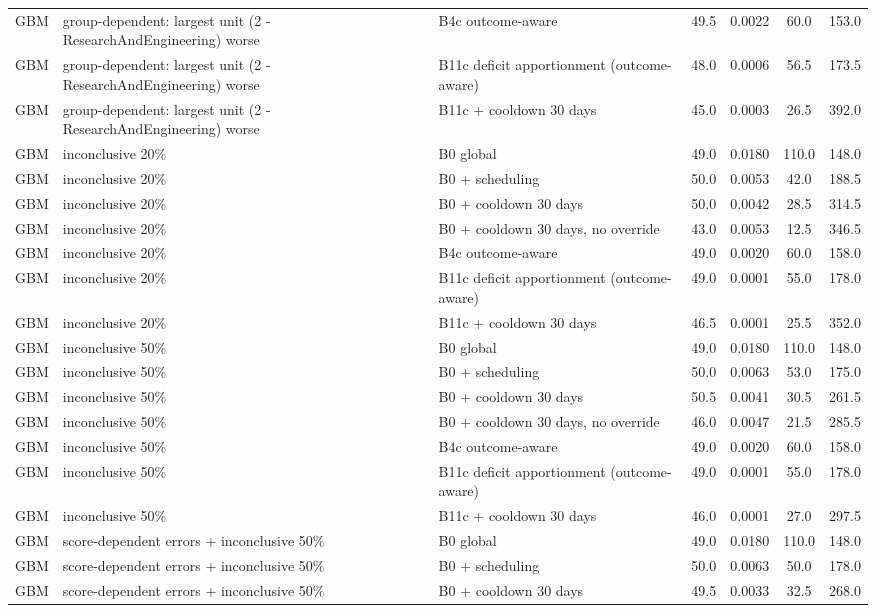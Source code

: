 \begin{longtable}{lp{5.2cm}p{4.4cm}cccc}
GBM & group-dependent: largest unit (2 - ResearchAndEngineering) worse & B4c outcome-aware & 49.5 & 0.0022 & 60.0 & 153.0 \\
GBM & group-dependent: largest unit (2 - ResearchAndEngineering) worse & B11c deficit apportionment (outcome-aware) & 48.0 & 0.0006 & 56.5 & 173.5 \\
GBM & group-dependent: largest unit (2 - ResearchAndEngineering) worse & B11c + cooldown 30 days & 45.0 & 0.0003 & 26.5 & 392.0 \\
GBM & inconclusive 20\% & B0 global & 49.0 & 0.0180 & 110.0 & 148.0 \\
GBM & inconclusive 20\% & B0 + scheduling & 50.0 & 0.0053 & 42.0 & 188.5 \\
GBM & inconclusive 20\% & B0 + cooldown 30 days & 50.0 & 0.0042 & 28.5 & 314.5 \\
GBM & inconclusive 20\% & B0 + cooldown 30 days, no override & 43.0 & 0.0053 & 12.5 & 346.5 \\
GBM & inconclusive 20\% & B4c outcome-aware & 49.0 & 0.0020 & 60.0 & 158.0 \\
GBM & inconclusive 20\% & B11c deficit apportionment (outcome-aware) & 49.0 & 0.0001 & 55.0 & 178.0 \\
GBM & inconclusive 20\% & B11c + cooldown 30 days & 46.5 & 0.0001 & 25.5 & 352.0 \\
GBM & inconclusive 50\% & B0 global & 49.0 & 0.0180 & 110.0 & 148.0 \\
GBM & inconclusive 50\% & B0 + scheduling & 50.0 & 0.0063 & 53.0 & 175.0 \\
GBM & inconclusive 50\% & B0 + cooldown 30 days & 50.5 & 0.0041 & 30.5 & 261.5 \\
GBM & inconclusive 50\% & B0 + cooldown 30 days, no override & 46.0 & 0.0047 & 21.5 & 285.5 \\
GBM & inconclusive 50\% & B4c outcome-aware & 49.0 & 0.0020 & 60.0 & 158.0 \\
GBM & inconclusive 50\% & B11c deficit apportionment (outcome-aware) & 49.0 & 0.0001 & 55.0 & 178.0 \\
GBM & inconclusive 50\% & B11c + cooldown 30 days & 46.0 & 0.0001 & 27.0 & 297.5 \\
GBM & score-dependent errors + inconclusive 50\% & B0 global & 49.0 & 0.0180 & 110.0 & 148.0 \\
GBM & score-dependent errors + inconclusive 50\% & B0 + scheduling & 50.0 & 0.0063 & 50.0 & 178.0 \\
GBM & score-dependent errors + inconclusive 50\% & B0 + cooldown 30 days & 49.5 & 0.0033 & 32.5 & 268.0 \\

\end{longtable}
